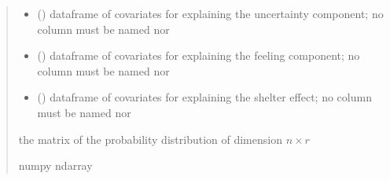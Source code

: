 \documentclass[letterpaper,10pt,english]{sphinxmanual}
\begin{document}
\begin{fulllineitems}
\begin{quote}
\begin{description}
\begin{itemize}
\item {} 
\sphinxAtStartPar
{} () \textendash{} dataframe of covariates for explaining the uncertainty component;
no column must be named  nor 

\item {} 
\sphinxAtStartPar
{} () \textendash{} dataframe of covariates for explaining the feeling component;
no column must be named  nor 

\item {} 
\sphinxAtStartPar
{} () \textendash{} dataframe of covariates for explaining the shelter effect;
no column must be named  nor 

\end{itemize}

\sphinxAtStartPar
the matrix of the probability distribution of dimension \(n \times r\)

\sphinxAtStartPar
numpy ndarray

\end{description}\end{quote}

\end{fulllineitems}

\end{document}
